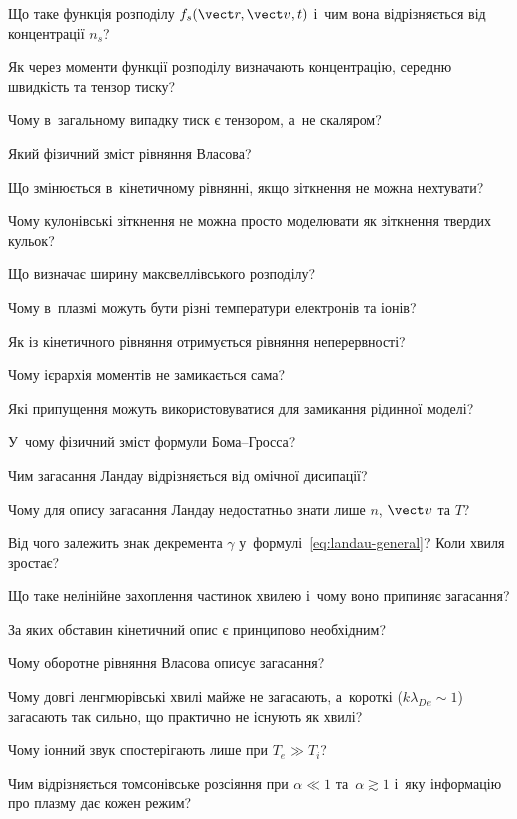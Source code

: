 \begin{Questions}
\begin{quizlist}
\item Що таке функція розподілу $f_s(\vect r,\vect v,t)$ і~чим вона відрізняється від
  концентрації $n_s$?
\item Як через моменти функції розподілу визначають концентрацію, середню швидкість та
  тензор тиску?
\item Чому в~загальному випадку тиск є тензором, а~не скаляром?
\item Який фізичний зміст рівняння Власова?
\item Що змінюється в~кінетичному рівнянні, якщо зіткнення не можна нехтувати?
\item Чому кулонівські зіткнення не можна просто моделювати як зіткнення твердих кульок?
\item Що визначає ширину максвеллівського розподілу?
\item Чому в~плазмі можуть бути різні температури електронів та іонів?
\item Як із кінетичного рівняння отримується рівняння неперервності?
\item Чому ієрархія моментів не замикається сама?
\item Які припущення можуть використовуватися для замикання рідинної моделі?
\item У~чому фізичний зміст формули Бома--Гросса?
\item Чим загасання Ландау відрізняється від омічної дисипації?
\item Чому для опису загасання Ландау недостатньо знати лише $n$, $\vect v$ та $T$?
\item Від чого залежить знак декремента $\gamma$ у~формулі~\eqref{eq:landau-general}? Коли хвиля зростає?
\item Що таке нелінійне захоплення частинок хвилею і~чому воно припиняє загасання?
\item За яких обставин кінетичний опис є принципово необхідним?
\item Чому оборотне рівняння Власова описує загасання?
\item Чому довгі ленгмюрівські хвилі майже не загасають, а~короткі ($k\lambda_{De}\sim1$) загасають так сильно, що практично не існують як хвилі?
\item Чому іонний звук спостерігають лише при $T_e\gg T_i$?
\item Чим відрізняється томсонівське розсіяння при $\alpha\ll1$ та~$\alpha\gtrsim1$ і~яку інформацію про плазму дає кожен режим?
\end{quizlist}
\end{Questions}

